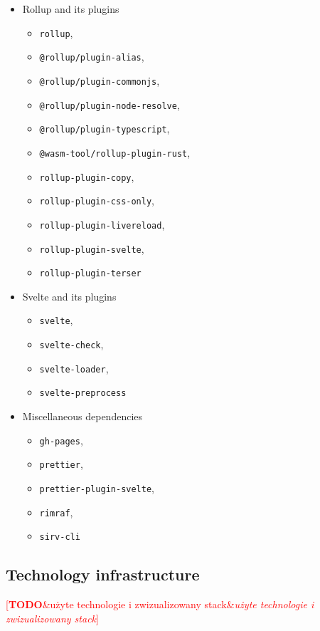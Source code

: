 \documentclass[english,engineering]{wizthesis}
\newcommand{\todo}[1]{%
  \textcolor{red}{[\textbf{TODO}\ifx&#1&{}\else{ }\fi\emph{#1}]}%
}
\begin{document}
\begin{itemize}
  \item Rollup and its plugins
  \begin{itemize}[noitemsep,nolistsep]
    \item \texttt{rollup},
    \item \texttt{@rollup/plugin-alias},
    \item \texttt{@rollup/plugin-commonjs},
    \item \texttt{@rollup/plugin-node-resolve},
    \item \texttt{@rollup/plugin-typescript},
    \item \texttt{@wasm-tool/rollup-plugin-rust},
    \item \texttt{rollup-plugin-copy},
    \item \texttt{rollup-plugin-css-only},
    \item \texttt{rollup-plugin-livereload},
    \item \texttt{rollup-plugin-svelte},
    \item \texttt{rollup-plugin-terser}
  \end{itemize}
  \item Svelte and its plugins
  \begin{itemize}[noitemsep,nolistsep]
    \item \texttt{svelte},
    \item \texttt{svelte-check},
    \item \texttt{svelte-loader},
    \item \texttt{svelte-preprocess}
  \end{itemize}
  \item Miscellaneous dependencies
  \begin{itemize}[noitemsep,nolistsep]
    \item \texttt{gh-pages},
    \item \texttt{prettier},
    \item \texttt{prettier-plugin-svelte},
    \item \texttt{rimraf},
    \item \texttt{sirv-cli}
  \end{itemize}
\end{itemize}

\subsection{Technology infrastructure}

\todo{użyte technologie i zwizualizowany stack}
\end{document}

